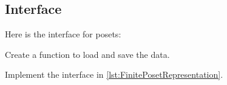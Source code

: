 

\begin{figure}

    \caption{}
    \label{fig:poset-finiteposet}
\end{figure}

\subsection*{Interface}

Here is the interface for posets:


%



\begin{codeexercise}
    Create a function to load and save the data.

    Implement the interface in \cref{lst:FinitePosetRepresentation}.
\end{codeexercise}


